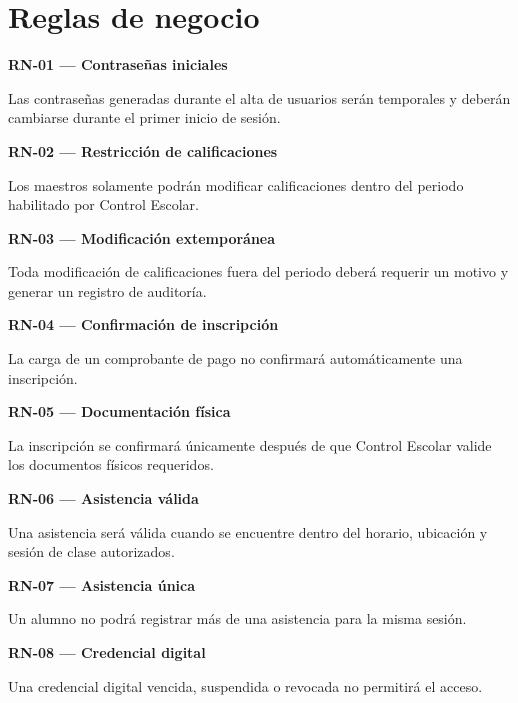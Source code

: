 \documentclass[12pt,a4paper]{article}
\newcommand{\RN}[1]{\textbf{\color{darkgray}RN-#1}}
\newenvironment{requisito}[1]
{
\begin{center}
\begin{minipage}{0.96\textwidth}
\colorbox{requirement}{
\begin{minipage}{0.94\textwidth}
\textbf{#1}
\end{minipage}
}
\vspace{2mm}
}
{
\end{minipage}
\end{center}
}
\begin{document}
\section{Reglas de negocio}

\begin{requisito}{\RN{01} --- Contraseñas iniciales}
Las contraseñas generadas durante el alta de usuarios serán temporales y deberán
cambiarse durante el primer inicio de sesión.
\end{requisito}

\begin{requisito}{\RN{02} --- Restricción de calificaciones}
Los maestros solamente podrán modificar calificaciones dentro del periodo
habilitado por Control Escolar.
\end{requisito}

\begin{requisito}{\RN{03} --- Modificación extemporánea}
Toda modificación de calificaciones fuera del periodo deberá requerir un motivo
y generar un registro de auditoría.
\end{requisito}

\begin{requisito}{\RN{04} --- Confirmación de inscripción}
La carga de un comprobante de pago no confirmará automáticamente una inscripción.
\end{requisito}

\begin{requisito}{\RN{05} --- Documentación física}
La inscripción se confirmará únicamente después de que Control Escolar valide
los documentos físicos requeridos.
\end{requisito}

\begin{requisito}{\RN{06} --- Asistencia válida}
Una asistencia será válida cuando se encuentre dentro del horario, ubicación y
sesión de clase autorizados.
\end{requisito}

\begin{requisito}{\RN{07} --- Asistencia única}
Un alumno no podrá registrar más de una asistencia para la misma sesión.
\end{requisito}

\begin{requisito}{\RN{08} --- Credencial digital}
Una credencial digital vencida, suspendida o revocada no permitirá el acceso.
\end{requisito}
\end{document}
